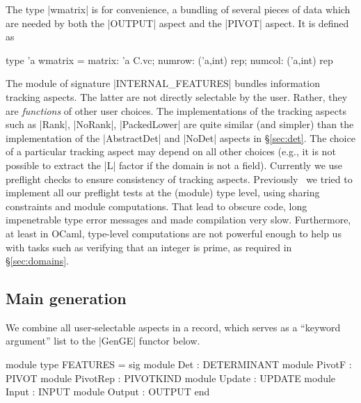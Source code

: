 \documentclass{elsart}
\begin{document}
The type |wmatrix| is for convenience, a bundling of several pieces
of data which are needed by both the |OUTPUT| aspect and the |PIVOT| 
aspect.  It is defined as
\begin{code}
type 'a wmatrix = {matrix: 'a C.vc; numrow: ('a,int) rep; 
                   numcol: ('a,int) rep}
\end{code}

The module of signature |INTERNAL_FEATURES| bundles information
tracking aspects. The latter are not directly selectable by the
user. Rather, they are \emph{functions} of other user choices. The
implementations of the tracking aspects such as |Rank|, |NoRank|,
|PackedLower| are quite similar (and simpler) than the implementation
of the |AbstractDet| and |NoDet| aspects in \S\ref{sec:det}. The
choice of a particular tracking aspect may depend on all other choices
(e.g., it is not possible to extract the |L| factor if the domain is
not a field). Currently we use preflight checks to ensure consistency
of tracking aspects. Previously~\cite{CaretteKiselyov05} we tried to
implement all our preflight tests at the (module) type level, using
sharing constraints and module computations. That lead to obscure
code, long impenetrable type error messages and made compilation very
slow.  Furthermore, at least in OCaml, type-level computations are not
powerful enough to help us with tasks such as verifying that an integer
is prime, as required in \S\ref{sec:domains}.

\subsection{Main generation}\label{sec:main-generation}
We combine all user-selectable aspects in a record, which serves as a ``keyword
argument'' list to the |GenGE| functor below.
\begin{code}
module type FEATURES = sig
  module Det       : DETERMINANT
  module PivotF    : PIVOT
  module PivotRep  : PIVOTKIND
  module Update    : UPDATE
  module Input     : INPUT
  module Output    : OUTPUT
end
\end{code}
\end{document}
